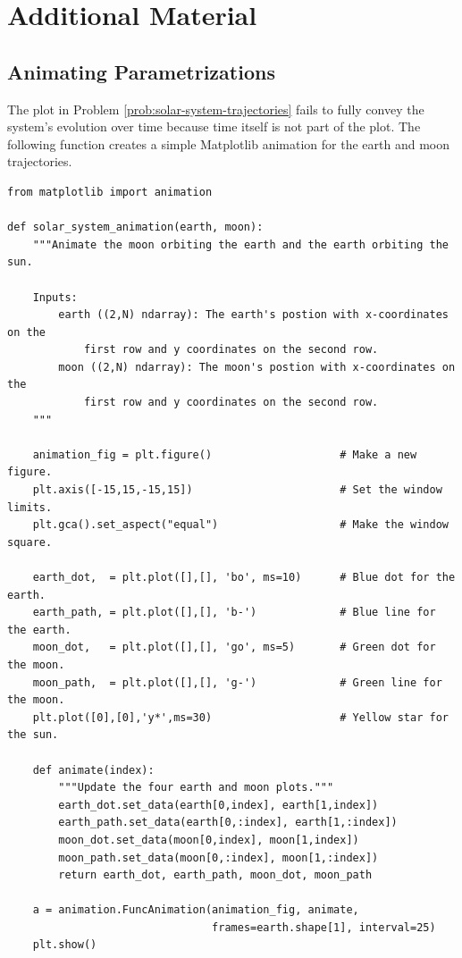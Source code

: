 \newpage

\section*{Additional Material} %

\subsection*{Animating Parametrizations} %

The plot in Problem \ref{prob:solar-system-trajectories} fails to fully convey the system's evolution over time because time itself is not part of the plot.
The following function creates a simple Matplotlib animation for the earth and moon trajectories.

\begin{lstlisting}
from matplotlib import animation

def solar_system_animation(earth, moon):
    """Animate the moon orbiting the earth and the earth orbiting the sun.

    Inputs:
        earth ((2,N) ndarray): The earth's postion with x-coordinates on the
            first row and y coordinates on the second row.
        moon ((2,N) ndarray): The moon's postion with x-coordinates on the
            first row and y coordinates on the second row.
    """

    animation_fig = plt.figure()                    # Make a new figure.
    plt.axis([-15,15,-15,15])                       # Set the window limits.
    plt.gca().set_aspect("equal")                   # Make the window square.

    earth_dot,  = plt.plot([],[], 'bo', ms=10)      # Blue dot for the earth.
    earth_path, = plt.plot([],[], 'b-')             # Blue line for the earth.
    moon_dot,   = plt.plot([],[], 'go', ms=5)       # Green dot for the moon.
    moon_path,  = plt.plot([],[], 'g-')             # Green line for the moon.
    plt.plot([0],[0],'y*',ms=30)                    # Yellow star for the sun.

    def animate(index):
        """Update the four earth and moon plots."""
        earth_dot.set_data(earth[0,index], earth[1,index])
        earth_path.set_data(earth[0,:index], earth[1,:index])
        moon_dot.set_data(moon[0,index], moon[1,index])
        moon_path.set_data(moon[0,:index], moon[1,:index])
        return earth_dot, earth_path, moon_dot, moon_path

    a = animation.FuncAnimation(animation_fig, animate,
                                frames=earth.shape[1], interval=25)
    plt.show()
\end{lstlisting}

